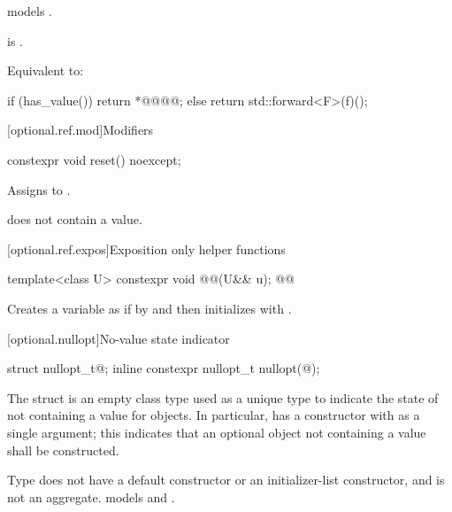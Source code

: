 \begin{itemdescr}
\pnum
\constraints
{} models .

\pnum
\mandates
{} is .

\pnum
\effects
Equivalent to:
\begin{codeblock}
if (has_value()) {
  return *@@@@;
} else {
  return std::forward<F>(f)();
}
\end{codeblock}
\end{itemdescr}

[optional.ref.mod]{Modifiers}

%
\begin{itemdecl}
constexpr void reset() noexcept;
\end{itemdecl}

\begin{itemdescr}
\pnum
\effects
Assigns  to .

\pnum
\ensures
{} does not contain a value.
\end{itemdescr}

[optional.ref.expos]{Exposition only helper functions}

%
\begin{itemdecl}
template<class U>
  constexpr void @@(U&& u);  @@
\end{itemdecl}

\begin{itemdescr}
\pnum
\effects
Creates a variable  as if by  and then initializes  with .
\end{itemdescr}

[optional.nullopt]{No-value state indicator}

\begin{removedblock}
%
%
\begin{itemdecl}
struct nullopt_t{@\seebelow@};
inline constexpr nullopt_t nullopt(@\unspec@);
\end{itemdecl}
\end{removedblock}

\begin{removedblock}
\pnum
The struct  is an empty class type used as a unique type to indicate the state of not containing a value for  objects. In particular,  has a constructor with  as a single argument; this indicates that an optional object not containing a value shall be constructed.

\pnum
Type  does not have a default constructor or an initializer-list constructor, and is not an aggregate.  models  and .
\end{removedblock}


